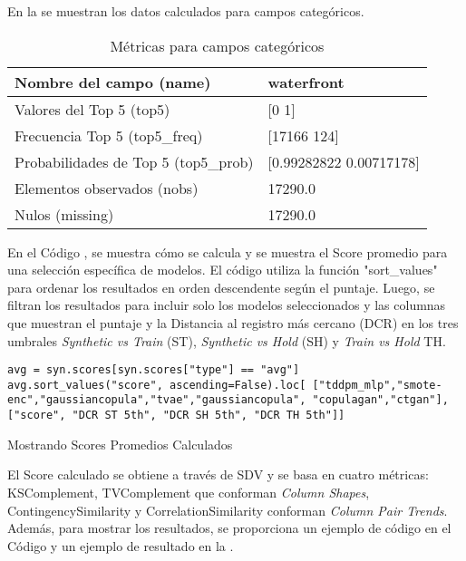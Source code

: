 \newpage
En la  se muestran los datos calculados para campos categóricos.

\begin{table}[H]
    \centering
    \caption{Métricas para campos categóricos}
    \label{metricas-categoricas}
    \begin{tabular}{|m{10em}|m{25em}|}
        \hline
        \rowcolor[gray]{0.8}
        Nombre del campo (name) & waterfront \\ \hline
        Valores del Top 5 (top5) & [0 1] \\ \hline
        Frecuencia Top 5 (top5\_freq) & [17166   124] \\ \hline
        Probabilidades de Top 5 (top5\_prob) & [0.99282822 0.00717178] \\ \hline
        Elementos observados (nobs) & 17290.0 \\ \hline
        Nulos (missing) & 17290.0 \\ \hline
    \end{tabular}
\end{table}
\newpage
En el Código , se muestra cómo se calcula y se muestra el Score promedio para una selección específica de modelos. El código utiliza la función "sort\_values" para ordenar los resultados en orden descendente según el puntaje. Luego, se filtran los resultados para incluir solo los modelos seleccionados y las columnas que muestran el puntaje y la Distancia al registro más cercano (DCR) en los tres umbrales \emph{Synthetic vs Train} (ST), \emph{Synthetic vs Hold} (SH) y \emph{Train vs Hold} TH.
\begin{listing}[H]
    \begin{verbatim}
avg = syn.scores[syn.scores["type"] == "avg"]
avg.sort_values("score", ascending=False).loc[ ["tddpm_mlp","smote-enc","gaussiancopula","tvae","gaussiancopula", "copulagan","ctgan"], ["score", "DCR ST 5th", "DCR SH 5th", "DCR TH 5th"]]
    \end{verbatim}
\caption{Mostrando Scores Promedios Calculados}
\label{codigo-show-score}
\end{listing}

El Score calculado se obtiene a través de SDV y se basa en cuatro métricas: KSComplement, TVComplement que conforman \emph{Column Shapes}, ContingencySimilarity y CorrelationSimilarity conforman \emph{Column Pair Trends}. Además, para mostrar los resultados, se proporciona un ejemplo de código en el Código  y un ejemplo de resultado en la .

